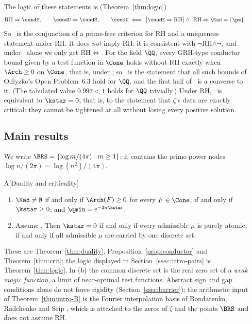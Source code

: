 The logic of these statements is (Theorem~\ref{thm:logic})
\[
\mathrm{RH}\Rightarrow\condE,\qquad \condU\Rightarrow\condS,\qquad
\condU\iff\big[\condE\Rightarrow\mathrm{RH}\big]\wedge\big[\mathrm{RH}\Rightarrow\Kad=\{\pz\}\big].
\]
So \condU\ is the conjunction of a prime-free criterion for RH and a uniqueness statement under RH. It does \emph{not} imply
RH: it is consistent with $\neg$RH$\wedge\neg$\condE, and under \condU\ alone we only get RH$\Leftrightarrow$\condE. For the field $\QQ$,
every GRH-type conductor bound given by a test function in $\Cone$ holds without RH exactly when $\Arch\ge0$ on $\Cone$, that is,
under \condE; so \condE\ is the statement that all such bounds of Odlyzko's Open Problem~6.3 hold for $\QQ$, and the first half
of \condU\ is a converse to it. (The tabulated value $0.997<1$ holds for $\QQ$ trivially.) Under RH, \condS\ is equivalent to
$\kstar=0$, that is, to the statement that $\zeta$'s data are exactly critical: they cannot be tightened at all without losing
every positive solution.

\subsection{Main results}

We write $\BRS=\{\log m/(4\pi):m\ge1\}$; it contains the prime-power nodes $\log n/(2\pi)=\log(n^2)/(4\pi)$.

\begin{lthm}{A}[Duality and criticality]\label{thm:intro-A}
\begin{enumerate}[label=\textup{(\alph*)}]
\item $\Kad\ne\emptyset$ if and only if $\Arch(F)\ge0$ for every $F\in\Cone$, if and only if $\kstar\ge0$; and $\qmin=e^{-2\pi\kstar}$.
\item Assume \condE. Then $\kstar=0$ if and only if every admissible $\mu$ is purely atomic, if and only if all admissible $\mu$ are
carried by one discrete set.
\end{enumerate}
\end{lthm}

These are Theorem~\ref{thm:duality}, Proposition~\ref{prop:conductor} and Theorem~\ref{thm:crit}; the logic displayed in
Section~\ref{ssec:intro-pairs} is Theorem~\ref{thm:logic}. In (b) the common discrete set is the real zero set of a \emph{weak magic
function}, a limit of near-optimal test functions. Abstract sign and gap conditions alone do not force rigidity
(Section~\ref{ssec:barrier}); the arithmetic input of Theorem~\ref{thm:intro-B} is the Fourier interpolation basis of Bondarenko, Radchenko and Seip \cite{BRS}, which
is attached to the zeros of $\zeta$ and the points $\BRS$ and does not assume RH.

